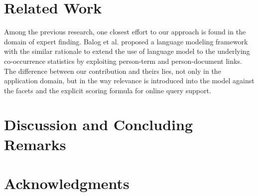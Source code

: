 \section{Related Work}


Among the previous research, one closest effort to our approach is found in the
domain of expert finding.  Balog et al. \cite{balog2009language} proposed a
language modeling framework with the similar rationale to extend the use of
language model to the underlying co-occurrence statistics by exploiting
person-term and person-document links.  The difference between our contribution
and theirs lies, not only in the application domain, but in the way relevance
is introduced into the model against the facets and the explicit scoring
formula for online query support.
 
\section{Discussion and Concluding Remarks}


% 
% 
% 

\section{Acknowledgments}


